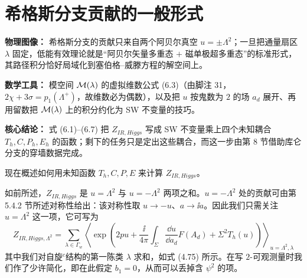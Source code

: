 
\section{希格斯分支贡献的一般形式}

\begin{keytakeaways}
\item \textbf{物理图像：} 希格斯分支的贡献只来自两个阿贝尔真空 $u=\pm\Lambda^{2}$；一旦把通量扇区 $\lambda$ 固定，低能有效理论就是“阿贝尔矢量多重态 $+$ 磁单极超多重态”的标准形式，其路径积分恰好局域化到塞伯格--威滕方程的解空间上。
\item \textbf{数学工具：} 模空间 $\mathcal{M}(\lambda)$ 的虚拟维数公式 (6.3)（由脚注 31，$2\chi+3\sigma=p_1(\Lambda^{+})$，故维数必为偶数），以及把 $u$ 按鬼数为 $2$ 的场 $a_d$ 展开、再用留数把 $\mathcal{M}(\lambda)$ 上的积分约化为 SW 不变量的技巧。
\item \textbf{核心结论：} 式 (6.1)--(6.7) 把 $Z_{IR,Higgs}$ 写成 SW 不变量乘上四个未知耦合 $T_h,C,P_h,E_h$ 的函数；剩下的任务只是定出这些耦合，而这一步由第 8 节借助库仑分支的穿墙数据完成。
\end{keytakeaways}

现在概述如何用未知函数 $T_h,C,P,E$ 来计算 $Z_{IR,Higgs}$。

如前所述，$Z_{IR,Higgs}$ 是 $u=\Lambda^{2}$ 与 $u=-\Lambda^{2}$ 两项之和。$u=-\Lambda^{2}$ 处的贡献可由第 5.4.2 节所述对称性给出：该对称性取 $u\to-u$、$a\to\ii a$。因此我们只需关注 $u=\Lambda^{2}$ 这一项，它可写为
\begin{equation}
Z_{IR,Higgs,\Lambda^{2}}
=
\sum_{\lambda\in\Gamma_w}
\left\langle
\exp\left(2pu+\frac{\ii}{4\pi}\int_{\Sigma}\frac{\dd u}{\dd a_d}F(A_d)+\Sigma^{2}T_h(u)\right)
\right\rangle_{u=\Lambda^{2},\lambda}
\tag{6.1}
\end{equation}
其中我们对自旋$^{c}$结构的第一陈类 $\lambda$ 求和，如式 (4.75) 所示。在写 $2$-可观测量时我们作了少许简化，即在此假定 $b_1=0$，从而可以丢掉含 $\psi^{2}$ 的项。

